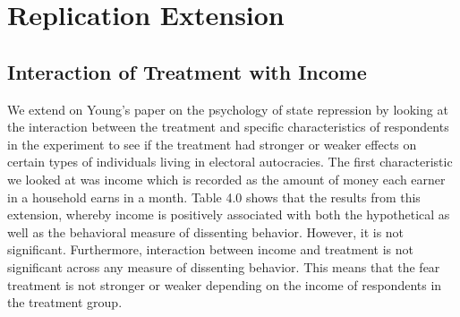 \documentclass{article}
\begin{document}
\section{Replication Extension}

\subsection{Interaction of Treatment with Income}

We extend on Young's paper on the psychology of state repression by looking at the interaction between the treatment and specific characteristics of respondents in the experiment to see if the treatment had stronger or weaker effects on certain types of individuals living in electoral autocracies. The first characteristic we looked at was income which is recorded as the amount of money each earner in a household earns in a month. Table 4.0 shows that the results from this extension, whereby income is positively associated with both the hypothetical as well as the behavioral measure of dissenting behavior. However, it is not significant. Furthermore, interaction between income and treatment is not significant across any measure of dissenting behavior. This means that the fear treatment is not stronger or weaker depending on the income of respondents in the treatment group. 
\end{document}
